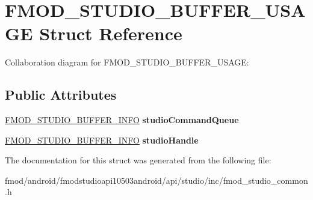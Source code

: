 \hypertarget{struct_f_m_o_d___s_t_u_d_i_o___b_u_f_f_e_r___u_s_a_g_e}{\section{F\+M\+O\+D\+\_\+\+S\+T\+U\+D\+I\+O\+\_\+\+B\+U\+F\+F\+E\+R\+\_\+\+U\+S\+A\+G\+E Struct Reference}
\label{struct_f_m_o_d___s_t_u_d_i_o___b_u_f_f_e_r___u_s_a_g_e}
}


Collaboration diagram for F\+M\+O\+D\+\_\+\+S\+T\+U\+D\+I\+O\+\_\+\+B\+U\+F\+F\+E\+R\+\_\+\+U\+S\+A\+G\+E\+:
\subsection*{Public Attributes}
\begin{DoxyCompactItemize}
\item 
\hypertarget{struct_f_m_o_d___s_t_u_d_i_o___b_u_f_f_e_r___u_s_a_g_e_add21a0bd751e674654c66e4ebbe53004}{\hyperlink{struct_f_m_o_d___s_t_u_d_i_o___b_u_f_f_e_r___i_n_f_o}{F\+M\+O\+D\+\_\+\+S\+T\+U\+D\+I\+O\+\_\+\+B\+U\+F\+F\+E\+R\+\_\+\+I\+N\+F\+O} {\bfseries studio\+Command\+Queue}}\label{struct_f_m_o_d___s_t_u_d_i_o___b_u_f_f_e_r___u_s_a_g_e_add21a0bd751e674654c66e4ebbe53004}

\item 
\hypertarget{struct_f_m_o_d___s_t_u_d_i_o___b_u_f_f_e_r___u_s_a_g_e_a03a0bbcd9a6c78bc05535d04f535c115}{\hyperlink{struct_f_m_o_d___s_t_u_d_i_o___b_u_f_f_e_r___i_n_f_o}{F\+M\+O\+D\+\_\+\+S\+T\+U\+D\+I\+O\+\_\+\+B\+U\+F\+F\+E\+R\+\_\+\+I\+N\+F\+O} {\bfseries studio\+Handle}}\label{struct_f_m_o_d___s_t_u_d_i_o___b_u_f_f_e_r___u_s_a_g_e_a03a0bbcd9a6c78bc05535d04f535c115}

\end{DoxyCompactItemize}


The documentation for this struct was generated from the following file\+:\begin{DoxyCompactItemize}
\item 
fmod/android/fmodstudioapi10503android/api/studio/inc/fmod\+\_\+studio\+\_\+common.\+h\end{DoxyCompactItemize}
